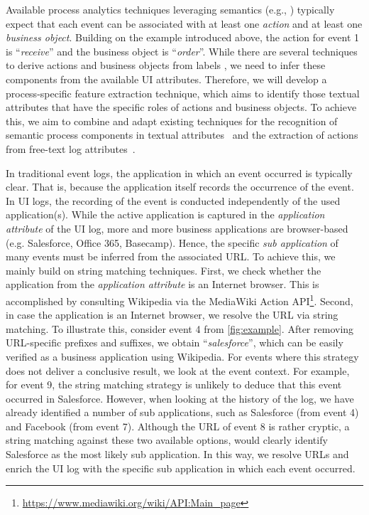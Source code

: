  Available process analytics techniques leveraging semantics (e.g., \cite{leopold2012probabilistic,leopold2015_jss,van2021natural}) typically expect that each event can be associated with at least one \textit{action} and at least one \textit{business object}. Building on the example introduced above, the action for event 1 is ``\textit{receive}'' and the business object is ``\textit{order}''. While there are several techniques to derive actions and business objects from labels \cite{leopold2012refactoring,leopold2019using,rebmann2021extracting}, we need to infer these components from the available UI attributes. Therefore, we will develop a process-specific feature extraction technique, which aims to identify those textual attributes that have the specific roles of actions and business objects. To achieve this, we aim to combine and adapt existing techniques for the recognition of semantic process components in textual attributes~\cite{rebmann2021extracting} and the extraction of actions from free-text log attributes~\cite{gupta2020analyzing}. 

 In traditional event logs, the application in which an event occurred is typically clear. That is, because the application itself records the occurrence of the event. In UI logs, the recording of the event is conducted independently of the used application(s). While the active application is captured in the \textit{application attribute} of the UI log, more and more business applications are browser-based (e.g. Salesforce, Office 365, Basecamp). Hence, the specific \textit{sub application} of many events must be inferred from the associated URL. To achieve this, we mainly build on string matching techniques. First, we check whether the application from the \textit{application attribute} is an Internet browser. This is accomplished by consulting Wikipedia via the MediaWiki Action API\footnote{\url{https://www.mediawiki.org/wiki/API:Main_page}}. Second, in case the application is an Internet browser, we resolve the URL via string matching. To illustrate this, consider event 4 from \autoref{fig:example}. After removing URL-specific prefixes and suffixes, we obtain ``\textit{salesforce}'', which can be easily verified as a business application using Wikipedia. For events where this strategy does not deliver a conclusive result, we look at the event context. For example, for event 9, the string matching strategy is unlikely to deduce that this event occurred in Salesforce. However, when looking at the history of the log, we have already identified a number of sub applications, such as Salesforce (from event 4) and Facebook (from event 7). Although the URL of event 8 is rather cryptic, a string matching against these two available options, would clearly identify Salesforce as the most likely sub application. In this way, we resolve URLs and enrich the UI log with the specific sub application in which each event occurred.  

